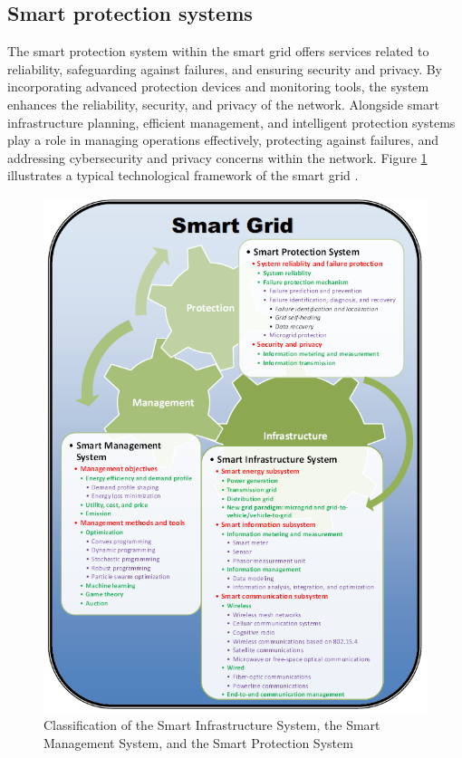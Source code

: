 \subsection{Smart protection systems}
The smart protection system within the smart grid offers services related to reliability, safeguarding against failures, and ensuring security and privacy. By incorporating advanced protection devices and monitoring tools, the system enhances the reliability, security, and privacy of the network. Alongside smart infrastructure planning, efficient management, and intelligent protection systems play a role in managing operations effectively, protecting against failures, and addressing cybersecurity and privacy concerns within the network. Figure \ref{fig:Classification} illustrates a typical technological framework of the smart grid \cite{shafiullah2013smart}.
\begin{figure}[h]
	\centering
	\includegraphics[width=12cm]{figures/Classification.PNG}
	\caption{Classification of the Smart Infrastructure System, the Smart Management System, and the Smart Protection
	System \cite{fang2011smart}}
	\label{fig:Classification}
\end{figure}

